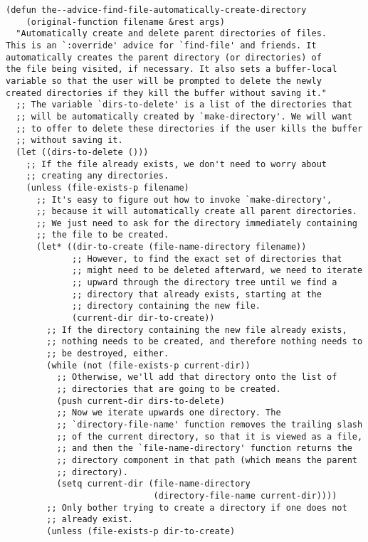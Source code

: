 \documentclass[11pt]{article}
\begin{document}
\begin{enumerate}
\begin{verbatim}
(defun the--advice-find-file-automatically-create-directory
    (original-function filename &rest args)
  "Automatically create and delete parent directories of files.
This is an `:override' advice for `find-file' and friends. It
automatically creates the parent directory (or directories) of
the file being visited, if necessary. It also sets a buffer-local
variable so that the user will be prompted to delete the newly
created directories if they kill the buffer without saving it."
  ;; The variable `dirs-to-delete' is a list of the directories that
  ;; will be automatically created by `make-directory'. We will want
  ;; to offer to delete these directories if the user kills the buffer
  ;; without saving it.
  (let ((dirs-to-delete ()))
    ;; If the file already exists, we don't need to worry about
    ;; creating any directories.
    (unless (file-exists-p filename)
      ;; It's easy to figure out how to invoke `make-directory',
      ;; because it will automatically create all parent directories.
      ;; We just need to ask for the directory immediately containing
      ;; the file to be created.
      (let* ((dir-to-create (file-name-directory filename))
             ;; However, to find the exact set of directories that
             ;; might need to be deleted afterward, we need to iterate
             ;; upward through the directory tree until we find a
             ;; directory that already exists, starting at the
             ;; directory containing the new file.
             (current-dir dir-to-create))
        ;; If the directory containing the new file already exists,
        ;; nothing needs to be created, and therefore nothing needs to
        ;; be destroyed, either.
        (while (not (file-exists-p current-dir))
          ;; Otherwise, we'll add that directory onto the list of
          ;; directories that are going to be created.
          (push current-dir dirs-to-delete)
          ;; Now we iterate upwards one directory. The
          ;; `directory-file-name' function removes the trailing slash
          ;; of the current directory, so that it is viewed as a file,
          ;; and then the `file-name-directory' function returns the
          ;; directory component in that path (which means the parent
          ;; directory).
          (setq current-dir (file-name-directory
                             (directory-file-name current-dir))))
        ;; Only bother trying to create a directory if one does not
        ;; already exist.
        (unless (file-exists-p dir-to-create)

\end{verbatim}
\end{enumerate}
\end{document}
